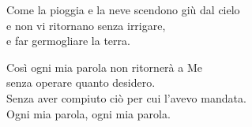 
Come la pioggia e la neve scendono giù dal cielo\\
e non vi ritornano senza irrigare,\\
e far germogliare la terra.

\spazio

Così ogni mia parola non ritornerà a Me\\
senza operare quanto desidero.\\
Senza aver compiuto ciò per cui l'avevo mandata.\\
Ogni mia parola, ogni mia parola.
